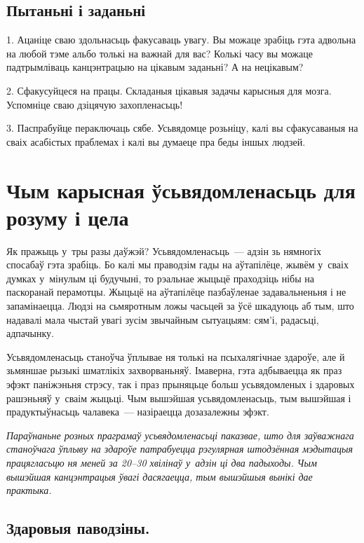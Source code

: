 \subsection*{Пытаньні і заданьні}

1. Ацаніце сваю здольнасьць факусаваць увагу. Вы можаце зрабіць гэта адвольна на любой тэме альбо толькі на важнай для вас? Колькі часу вы можаце падтрымліваць канцэнтрацыю на цікавым заданьні? А на нецікавым?

2. Сфакусуйцеся на працы. Складаныя цікавыя задачы карысныя для мозга. Успомніце сваю дзіцячую захопленасьць!

3. Паспрабуйце пераключаць сябе. Усьвядомце розьніцу, калі вы сфакусаваныя на сваіх асабістых праблемах і калі вы думаеце пра беды іншых людзей.


\section{Чым карысная ўсьвядомленасьць для розуму і цела}

Як пражыць у~тры разы даўжэй? Усьвядомленасьць~--- адзін зь нямногіх спосабаў гэта зрабіць. Бо калі мы праводзім гады на аўтапілёце, жывём у~сваіх думках у~мінулым ці будучыні, то рэальнае жыцьцё праходзіць нібы на паскоранай перамотцы. Жыцьцё на аўтапілёце пазбаўленае задавальненьня і не запамінаецца. Людзі на сьмяротным ложы часьцей за ўсё шкадуюць аб тым, што надавалі мала чыстай увагі зусім звычайным сытуацыям: сям'і, радасьці, адпачынку.


Усьвядомленасьць станоўча ўплывае ня толькі на псыхалягічнае здароўе, але й зьмяншае рызыкі шматлікіх захворваньняў. Імаверна, гэта адбываецца як праз эфэкт паніжэньня стрэсу, так і праз прыняцьце больш усьвядомленых і здаровых рашэньняў у~сваім жыцьці. Чым вышэйшая усьвядомленасьць, тым вышэйшая і прадуктыўнасьць чалавека~--- назіраецца дозазалежны эфэкт.

\emph{Параўнаньне розных праграмаў усьвядомленасьці паказвае, што для заўважнага станоўчага ўплыву на здароўе патрабуецца рэгулярная штодзённая мэдытацыя працягласьцю ня меней за 20--30 хвілінаў у~адзін ці два падыходы. Чым вышэйшая канцэнтрацыя ўвагі дасягаецца, тым вышэйшыя вынікі дае практыка.}

\subsection*{Здаровыя паводзіны.}

